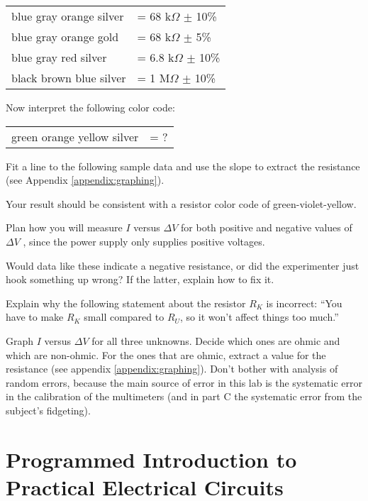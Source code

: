 \begin{tabular}{ll}
   blue   gray   orange   silver    &= 68 k$\Omega$  $\pm$ 10\%  \\
   blue   gray   orange   gold    &= 68 k$\Omega$  $\pm$ 5\%  \\
   blue   gray   red   silver    &= 6.8 k$\Omega$  $\pm$ 10\%  \\
   black   brown   blue   silver    &= 1 M$\Omega$  $\pm$ 10\%  
\end{tabular}

Now interpret the following color code:

\begin{tabular}{ll}
   green   orange   yellow   silver    &=    ?  
\end{tabular}

\prelabquestion  Fit a line to the following sample data and use the
slope to extract the resistance (see Appendix \ref{appendix:graphing}).


Your result should be consistent with a resistor color code
of green-violet-yellow.

\prelabquestion  Plan how you will measure $I$ versus $\Delta V$ for both
positive and negative values of $\Delta V$ , since the power
supply only supplies positive voltages.

\prelabquestion  Would data like these indicate a negative resistance, or
did the experimenter just hook something up wrong? If the
latter, explain how to fix it.


\prelabquestion  Explain why the following statement about the resistor
$R_K$ is incorrect:
``You have to make $R_K$ small compared to $R_U$, so it
won't affect things too much.''


\analysis

Graph $I$ versus $\Delta V$  for all three unknowns. Decide
which ones are ohmic and which are non-ohmic. For the ones
that are ohmic, extract a value for the resistance (see
appendix \ref{appendix:graphing}). Don't
bother with analysis of random errors, because the main
source of error in this lab is the systematic error in the
calibration of the multimeters (and in part C the
systematic error from the subject's fidgeting).

\section*{Programmed Introduction to Practical Electrical Circuits}

